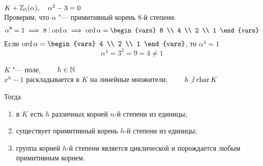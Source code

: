 \begin{eg}
	$ K + \mathbb{Z}_5(\alpha), \quad \alpha^2 - 3 = 0 $ \\
	Проверим, что $ \alpha $ "--- примитивный корень 8-й степени:
	$$ \alpha^8 = 1 \implies 8 \divby \ord \alpha \implies \ord \alpha =
	\begin{vars}
		8 \\
		4 \\
		2 \\
		1
	\end{vars} $$
	Если $ \ord \alpha =
	\begin{vars}
		4 \\
		2 \\
		1
	\end{vars} $, то $ \alpha^4 = 1 $
	$$ \alpha^4 = 3^2 = 9 = 4 \ne 1 $$
\end{eg}

\begin{theorem}
	$ K $ "--- поле, $ \qquad h \in \mathbb{N} $ \\
	$ x^h - 1 $ раскладывается в $ K $ на линейные множители, $ \qquad h \ndivby \chara K $

	Тогда
	\begin{enumerate}
		\item в $ K $ есть $ h $ различных корней $ n $-й степени из единицы;
		\item существует примитивный корень $ h $-й степени из единицы;
		\item группа корней $ h $-й степени является циклической и порождается любым примитивным корнем.
	\end{enumerate}
\end{theorem}

